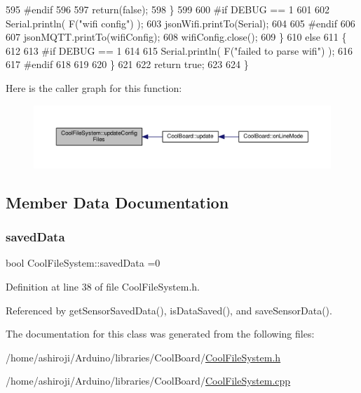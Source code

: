 \begin{DoxyCode}
595 \textcolor{preprocessor}{        #endif}
596         
597             \textcolor{keywordflow}{return}(\textcolor{keyword}{false});
598         \}
599 
600 \textcolor{preprocessor}{#if DEBUG == 1 }
601 
602         Serial.println( F(\textcolor{stringliteral}{"wifi config"}) );
603         jsonWifi.printTo(Serial);
604 
605 \textcolor{preprocessor}{#endif}
606     
607         jsonMQTT.printTo(wifiConfig);
608         wifiConfig.close();
609     \}
610     \textcolor{keywordflow}{else}
611     \{
612 
613 \textcolor{preprocessor}{    #if DEBUG == 1 }
614 
615         Serial.println( F(\textcolor{stringliteral}{"failed to parse wifi"}) );
616     
617 \textcolor{preprocessor}{    #endif}
618 
619     
620     \}   
621         
622     \textcolor{keywordflow}{return} \textcolor{keyword}{true};
623 
624 \}   
\end{DoxyCode}
Here is the caller graph for this function\+:\nopagebreak
\begin{figure}[H]
\begin{center}
\leavevmode
\includegraphics[width=350pt]{classCoolFileSystem_a32dad79ae80182a83e2e8f52286b7c7b_icgraph}
\end{center}
\end{figure}


\subsection{Member Data Documentation}
\mbox{\label{classCoolFileSystem_ad398e0c5c41a0c88acdf5d672aa71351}} 
\subsubsection{\texorpdfstring{saved\+Data}{savedData}}
{\footnotesize\ttfamily bool Cool\+File\+System\+::saved\+Data =0\hspace{0.3cm}{\ttfamily [private]}}



Definition at line 38 of file Cool\+File\+System.\+h.



Referenced by get\+Sensor\+Saved\+Data(), is\+Data\+Saved(), and save\+Sensor\+Data().



The documentation for this class was generated from the following files\+:\begin{DoxyCompactItemize}
\item 
/home/ashiroji/\+Arduino/libraries/\+Cool\+Board/\hyperlink{CoolFileSystem_8h}{Cool\+File\+System.\+h}\item 
/home/ashiroji/\+Arduino/libraries/\+Cool\+Board/\hyperlink{CoolFileSystem_8cpp}{Cool\+File\+System.\+cpp}\end{DoxyCompactItemize}
